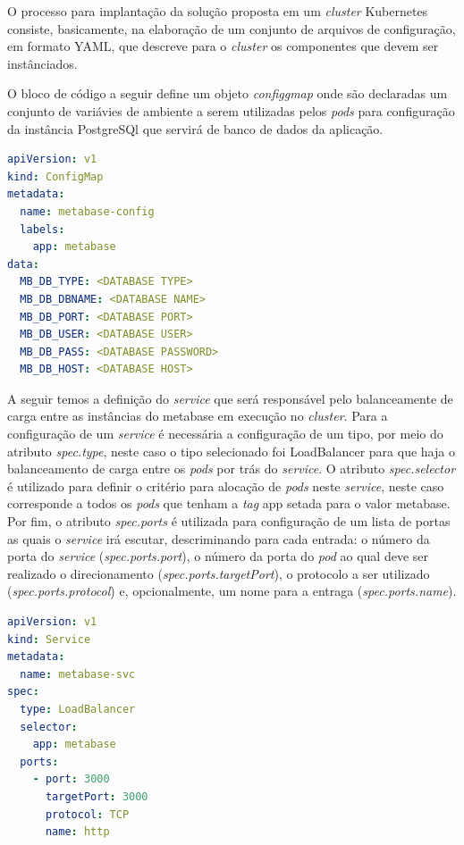 O processo para implantação da solução proposta em um \textit{cluster} Kubernetes consiste, basicamente, na elaboração de um conjunto de arquivos de configuração, em formato YAML, que descreve para o \textit{cluster} os componentes que devem ser instânciados. 

O bloco de código a seguir define um objeto \textit{configgmap} onde são declaradas um conjunto de variávies de ambiente a serem utilizadas pelos \textit{pods} para configuração da instância PostgreSQl que servirá de banco de dados da aplicação.

\begin{lstlisting}[caption={YAML de configuração do \textit{Config Map}},label={lst:configmap},language=yaml]
apiVersion: v1
kind: ConfigMap
metadata:
  name: metabase-config
  labels:
    app: metabase
data:
  MB_DB_TYPE: <DATABASE TYPE>
  MB_DB_DBNAME: <DATABASE NAME>
  MB_DB_PORT: <DATABASE PORT>
  MB_DB_USER: <DATABASE USER>
  MB_DB_PASS: <DATABASE PASSWORD>
  MB_DB_HOST: <DATABASE HOST>
\end{lstlisting} 

A seguir temos a definição do \textit{service} que será responsável pelo balanceamente de carga entre as instâncias do metabase em execução no \textit{cluster}. Para a configuração de um \textit{service} é necessária a configuração de um tipo, por meio do atributo \textit{spec.type}, neste caso o tipo selecionado foi LoadBalancer para que haja o balanceamento de carga entre os \textit{pods} por trás do \textit{service}. O atributo \textit{spec.selector} é utilizado para definir o critério para alocação de \textit{pods} neste \textit{service}, neste caso corresponde a todos os \textit{pods} que tenham a \textit{tag} app setada para o valor metabase. Por fim, o atributo \textit{spec.ports} é utilizada para configuração de um lista de portas as quais o \textit{service} irá escutar, descriminando para cada entrada: o número da porta do \textit{service} (\textit{spec.ports.port}), o número da porta do \textit{pod} ao qual deve ser realizado o direcionamento (\textit{spec.ports.targetPort}), o protocolo a ser utilizado (\textit{spec.ports.protocol}) e, opcionalmente, um nome para a entraga (\textit{spec.ports.name}). 

\begin{lstlisting}[caption={YAML de configuração do \textit{service}},label={lst:service},language=yaml]
apiVersion: v1
kind: Service
metadata:
  name: metabase-svc
spec:
  type: LoadBalancer
  selector:
    app: metabase
  ports:
    - port: 3000
      targetPort: 3000
      protocol: TCP
      name: http
\end{lstlisting} 

